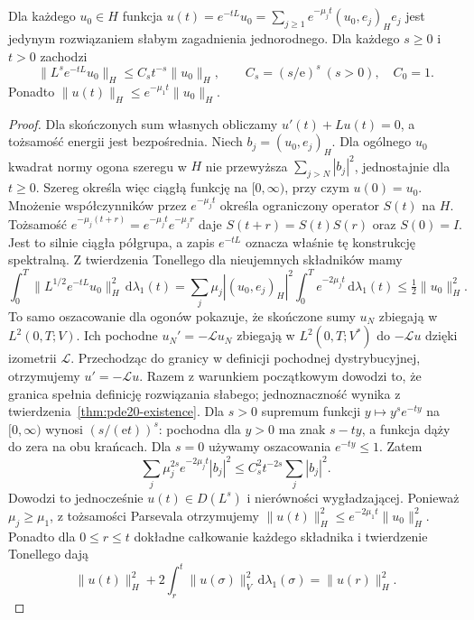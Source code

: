 \begin{twierdzenie}\label{thm:pde20-semigroup}
Dla każdego $u_0\in H$ funkcja
$u(t)=e^{-tL}u_0=\sum_{j\ge1}e^{-\mu_jt}(u_0,e_j)_He_j$
jest jedynym rozwiązaniem słabym zagadnienia jednorodnego.
Dla każdego $s\ge0$ i $t>0$ zachodzi
\[
 \|L^se^{-tL}u_0\|_H
 \le C_s t^{-s}\|u_0\|_H,
 \qquad C_s=(s/\mathrm e)^s\ (s>0),\quad C_0=1.
\]
Ponadto $\|u(t)\|_H\le e^{-\mu_1t}\|u_0\|_H$.
\end{twierdzenie}
\begin{proof}
Dla skończonych sum własnych obliczamy
$u'(t)+Lu(t)=0$, a tożsamość energii jest bezpośrednia.
Niech $b_j=(u_0,e_j)_H$. Dla ogólnego $u_0$
kwadrat normy ogona szeregu w $H$ nie przewyższa
$\sum_{j>N}|b_j|^2$, jednostajnie dla $t\ge0$.
Szereg określa więc ciągłą funkcję na $[0,\infty)$,
przy czym $u(0)=u_0$.
Mnożenie współczynników przez $e^{-\mu_jt}$ określa
ograniczony operator $S(t)$ na $H$. Tożsamość
$e^{-\mu_j(t+r)}=e^{-\mu_jt}e^{-\mu_jr}$ daje
$S(t+r)=S(t)S(r)$ oraz $S(0)=I$.
Jest to silnie ciągła półgrupa, a zapis $e^{-tL}$
oznacza właśnie tę konstrukcję spektralną.
Z twierdzenia Tonellego dla nieujemnych składników mamy
\[
 \int_0^T\|L^{1/2}e^{-tL}u_0\|_H^2\,\mathrm d\lambda_1(t)
 =\sum_j\mu_j|(u_0,e_j)_H|^2
 \int_0^T e^{-2\mu_jt}\,\mathrm d\lambda_1(t)
 \le\tfrac12\|u_0\|_H^2.
\]
To samo oszacowanie dla ogonów pokazuje, że
skończone sumy $u_N$ zbiegają w $L^2(0,T;V)$.
Ich pochodne $u_N'=-\mathcal Lu_N$ zbiegają
w $L^2(0,T;V^*)$ do $-\mathcal Lu$ dzięki izometrii
$\mathcal L$. Przechodząc do granicy w definicji
pochodnej dystrybucyjnej, otrzymujemy
$u'=-\mathcal Lu$. Razem z warunkiem początkowym
dowodzi to, że granica spełnia definicję rozwiązania słabego;
jednoznaczność wynika z twierdzenia~\ref{thm:pde20-existence}.
Dla $s>0$ supremum funkcji $y\mapsto y^se^{-ty}$ na
$[0,\infty)$ wynosi $(s/(\mathrm et))^s$: pochodna
dla $y>0$ ma znak $s-ty$, a funkcja dąży do zera
na obu krańcach. Dla $s=0$ używamy oszacowania
$e^{-ty}\le1$. Zatem
\[
 \sum_j\mu_j^{2s}e^{-2\mu_jt}|b_j|^2
 \le C_s^2t^{-2s}\sum_j|b_j|^2.
\]
Dowodzi to jednocześnie $u(t)\in D(L^s)$ i nierówności
wygładzającej. Ponieważ $\mu_j\ge\mu_1$,
z tożsamości Parsevala otrzymujemy
$\|u(t)\|_H^2\le e^{-2\mu_1t}\|u_0\|_H^2$.
Ponadto dla $0\le r\le t$ dokładne całkowanie
każdego składnika i twierdzenie Tonellego dają
\[
 \|u(t)\|_H^2+2\int_r^t\|u(\sigma)\|_V^2
 \,\mathrm d\lambda_1(\sigma)=\|u(r)\|_H^2.
\]
\end{proof}


